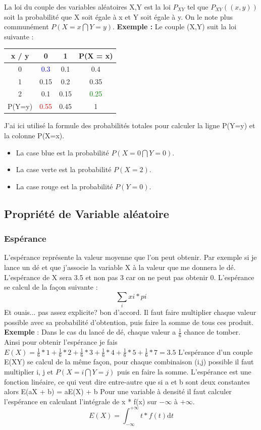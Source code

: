 \documentclass[a4paper]{article}
\begin{document}
La loi du couple des variables aléatoires X,Y est la loi $P_{XY}$ tel que $P_{XY}({(x,y)})$ soit la probabilité que X soit égale à x et Y soit égale à y. On le note plus communément $P(X=x \bigcap Y=y)$. \newline
\textbf{Exemple :} Le couple (X,Y) suit la loi suivante : \newline
\begin{tabular}{|c|c|c|c|}
\hline
x / y & 0 & 1 & P(X = x)\\
\hline
0 & \textcolor{Blue}{0.3} & 0.1 & 0.4\\
\hline
1 & 0.15 & 0.2 & 0.35 \\
\hline
2 & 0.1 & 0.15 & \textcolor{Green}{0.25}\\
\hline
P(Y=y) & \textcolor{Red}{0.55} & 0.45 & 1\\
\hline
\end{tabular}
\newline
J'ai ici utilisé la formule des probabilités totales pour calculer la ligne P(Y=y) et la colonne P(X=x).
\begin{itemize}
\item La case blue est la probabilité $P(X=0 \bigcap Y=0)$. 
\item La case verte est la probabilité $P(X=2)$. 
\item La case rouge est la probabilité $P(Y=0)$. 
\end{itemize}

\subsection{Propriété de Variable aléatoire}
\subsubsection{Espérance}
L'espérance représente la valeur moyenne que l'on peut obtenir. Par exemple si je lance un dé et que j'associe la variable X à la valeur que me donnera le dé. L'espérance de X sera 3.5 et non pas 3 car on ne peut pas obtenir 0. L'espérance se calcul de la façon suivante :
$$ \sum_i xi * pi $$ \newline
Et ouais... pas assez explicite? bon d'accord. Il faut faire multiplier chaque valeur possible avec sa probabilité d'obtention, puis faire la somme de tous ces produit.
\newline \textbf{Exemple} : Dans le cas du lancé de dé, chaque valeur a $\frac{1}{6}$ chance de tomber. Ainsi pour obtenir l'espérance je fais $ E(X) = \frac{1}{6} * 1 + \frac{1}{6} * 2 + \frac{1}{6} * 3 + \frac{1}{6} * 4 + \frac{1}{6} * 5 + \frac{1}{6} * 7 = 3.5$ 
\newline
L'espérance d'un couple E(XY) se calcul de la même façon, pour chaque combinaison (i,j) possible il faut multiplier i, j et $P(X=i \bigcap Y=j)$ puis en faire la somme.
\newline
L'espérance est une fonction linéaire, ce qui veut dire entre-autre que si a et b sont deux constantes alors E(aX + b) = aE(X) + b
\newline
Pour une variable à densité il faut calculer l'espérance en calculant l'intégrale de x * f(x) sur $-\infty$ à $+\infty$. $$ E(X) =  \int_{-\infty}^{+\infty} t * f(t)\text{d}t$$
\end{document}
